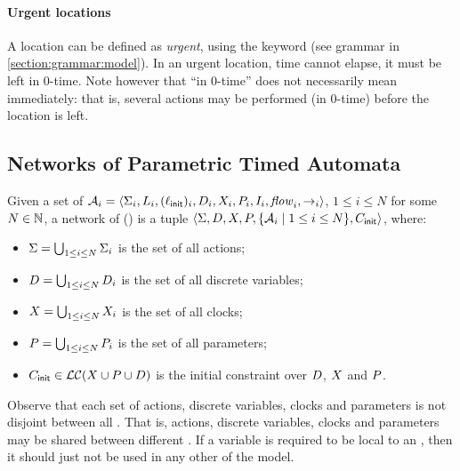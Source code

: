 \paragraph{Urgent locations}
A location can be defined as \emph{urgent}, using the keyword  (see grammar in  \cref{section:grammar:model}).
In an urgent location, time cannot elapse, \ie{} it must be left in $0$-time.
Note however that ``in $0$-time'' does not necessarily mean immediately: that is, several actions may be performed (in $0$-time) before the location is left.





\subsection{Networks of \imitator{} Parametric Timed Automata}

\begin{definition}[\NIPTA{}]
	Given a set of \IPTA{} $\mathcal{A}_i = \langle\Sigma_i, L_i, (\ell_{\textsf{init}})_i, D_i, X_i, P_i, I_i, \mathit{flow}_i, {\rightarrow}_i\rangle$, $1 \leq i \leq N$ for some $N \in {\mathbb N}$,
	a network of \IPTA{} (\emph{\NIPTA{}}) is a tuple
	$\langle\Sigma, D, X, P, \{ \mathcal{A}_i \mid 1 \leq i \leq N \}, C_{\textsf{init}}\rangle$, where:
	\begin{itemize}
		\item $\Sigma = \bigcup_{1 \leq i \leq N} \Sigma_i$ is the set of all actions;
		\item $D = \bigcup_{1 \leq i \leq N} D_i$ is the set of all discrete variables;
		\item $X = \bigcup_{1 \leq i \leq N} X_i$ is the set of all clocks;
		\item $P = \bigcup_{1 \leq i \leq N} P_i$ is the set of all parameters;
		\item $C_{\textsf{init}} \in \mathcal{LC}(X \cup P \cup D)$ is the initial constraint over $D$, $X$ and $P$. %
	\end{itemize}
\end{definition}

Observe that each set of actions, discrete variables, clocks and parameters is not disjoint between all \IPTA{}.
That is, actions, discrete variables, clocks and parameters may be shared between different \IPTA{}.
If a variable is required to be local to an \IPTA{}, then it should just not be used in any other \IPTA{} of the model.

